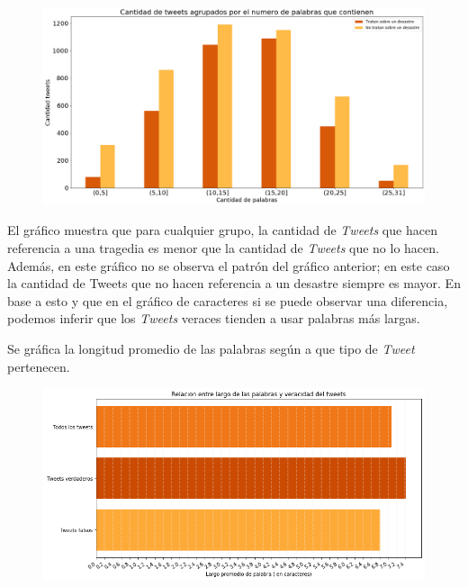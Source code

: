 \documentclass[titlepage,a4paper]{article}
\begin{document}
    \begin{figure}[H]
    \centering
    \includegraphics[width=1\textwidth]{graficos/Analisis Lexico Grafico/cantidad_de_tweets_agrupados_por_numero_de_palabras.png}
    \caption{}
    \end{figure}
    
    El gráfico muestra que para cualquier grupo, la cantidad de \textit{Tweets} que hacen referencia a una tragedia es menor que la cantidad de \textit{Tweets} que no lo hacen. Además, en este gráfico no se observa el patrón del gráfico anterior; en este caso la cantidad de Tweets que no hacen referencia a un desastre siempre es mayor. En base a esto y que en el gráfico de caracteres si se puede observar una diferencia, podemos inferir que los \textit{Tweets} veraces tienden a usar palabras más largas.
    
    Se gráfica la longitud promedio de las palabras según a que tipo de \textit{Tweet} pertenecen. 
    
     \begin{figure}[H]
    \centering
    \includegraphics[width=1\textwidth]{graficos/Analisis Lexico Grafico/longitud promedio barras.png}
    \caption{}
    \end{figure}
\end{document}
